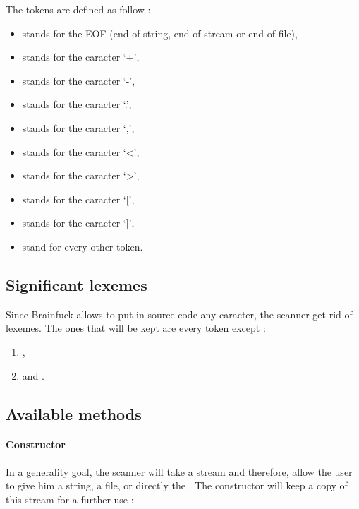 The tokens are defined as follow :
\begin{itemize}
        \item {} stands for the EOF (\ie end of string, end of stream or end of file),

        \item {} stands for the caracter `+',
        \item {} stands for the caracter `-',

        \item {} stands for the caracter `.',
        \item {} stands for the caracter `,',

        \item {} stands for the caracter `<',
        \item {} stands for the caracter `>',

        \item {} stands for the caracter `[',
        \item {} stands for the caracter `]',

        \item {} stand for every other token.
\end{itemize}

\subsection{Significant lexemes\label{significantLexemes}}
Since Brainfuck allows to put in source code any caracter, the scanner get rid of lexemes. The ones that will be kept are every token except :
\begin{enumerate}
        \item {},
        \item and .
\end{enumerate}

\subsection{Available methods}
\paragraph{Constructor} 
In a generality goal, the scanner will take a stream and therefore, allow the user to give him a string, a file, or directly the . The constructor will keep a copy of this stream for a further use :

